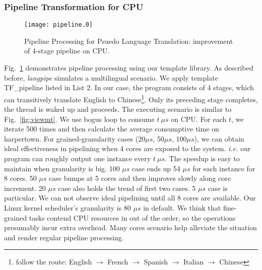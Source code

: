 \subsubsection{Pipeline Transformation for CPU}
\begin{figure}[htp]
\texttt{[image: pipeline.0]}
\caption{Pipeline Processing for Psuedo Language Translation:
  improvement of 4-stage pipeline on CPU.}\label{fig:pipe}
\end{figure}

Fig.~\ref{fig:pipe} demonstrates pipeline processing using our
template library. As described before, \textit{langpipe} simulates a
multilingual scenario. We apply template TF\_pipeline listed in
List 2. In our case, the program consists of 4 stages,
which can transitively translate English to Chinese\footnote{follow the 
  route: English  $\to$ French $\to$ Spanish $\to$ Italian $\to$
  Chinese}. Only its preceding stage completes,  the thread is waked
up and proceeds. The executing scenario is similar to Fig.~\ref{fig:viewmt}. We use bogus loop to consume $t \  \mu s$ on CPU. For each $t$, we iterate 500
times and then calculate the average consumptive time on harpertown. For
grained-granularity cases (20$\mu s$, 50$\mu s$, 100$\mu s$), we can obtain ideal
effectiveness in pipelining when 4 cores are exposed to the system.
\textit{i.e.} our program can roughly output one instance every $t\  \mu
s$. The speedup is easy to maintain when granularity is big. 100 $\mu s$ case ends up 54 $\mu s$ for each instance for 8 cores. 50  $\mu s$ case
bumps at 5 cores and then improves slowly along core increment. 20
$\mu s$ case also holds the trend of first two cases. 5 $\mu s$ case is
particular. We can not observe ideal pipelining until all 8
cores are available.  Our Linux kernel scheduler's granularity is 80
$\mu s$ in default. We think that fine-grained tasks contend
CPU resources in out of the order, so the operations presumably
incur extra overhead. Many cores scenario help alleviate the
situation and render regular pipeline processing.

